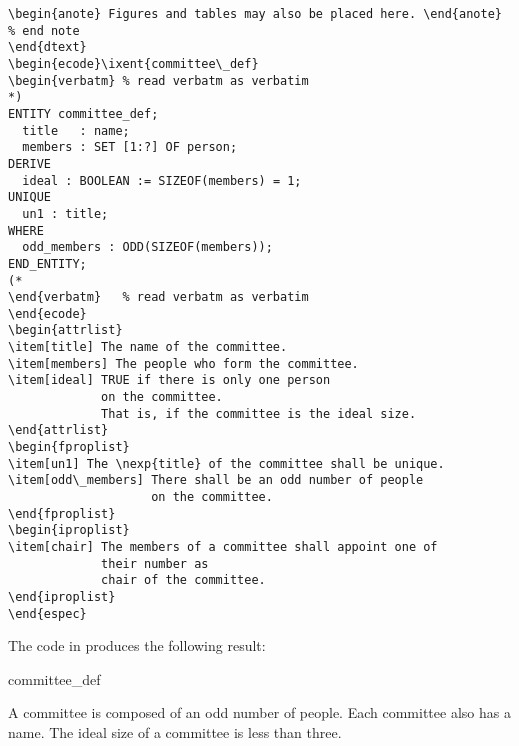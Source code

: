 \documentclass[wd,copyright,letterpaper]{isov2}
\begin{document}
{{\begin{example}
\begin{verbatim}
\begin{anote} Figures and tables may also be placed here. \end{anote} % end note
\end{dtext}
\begin{ecode}\ixent{committee\_def}
\begin{verbatm} % read verbatm as verbatim
*)
ENTITY committee_def;
  title   : name;
  members : SET [1:?] OF person;
DERIVE
  ideal : BOOLEAN := SIZEOF(members) = 1;
UNIQUE
  un1 : title;
WHERE
  odd_members : ODD(SIZEOF(members));
END_ENTITY;
(*
\end{verbatm}   % read verbatm as verbatim
\end{ecode}
\begin{attrlist}
\item[title] The name of the committee.
\item[members] The people who form the committee.
\item[ideal] TRUE if there is only one person 
             on the committee.
             That is, if the committee is the ideal size.
\end{attrlist}
\begin{fproplist}
\item[un1] The \nexp{title} of the committee shall be unique.
\item[odd\_members] There shall be an odd number of people 
                    on the committee.
\end{fproplist}
\begin{iproplist}
\item[chair] The members of a committee shall appoint one of 
             their number as
             chair of the committee.
\end{iproplist}
\end{espec}
\end{verbatim}
\end{example} %

\begin{example}
The code in  produces the following result:

\begin{espec}{committee_def}
\begin{dtext}
    A committee is composed of an odd number of people. 
Each committee also has a name.
The ideal size of a committee is less than three.


\end{dtext}
\end{espec}
\end{example}}}
\end{document}

